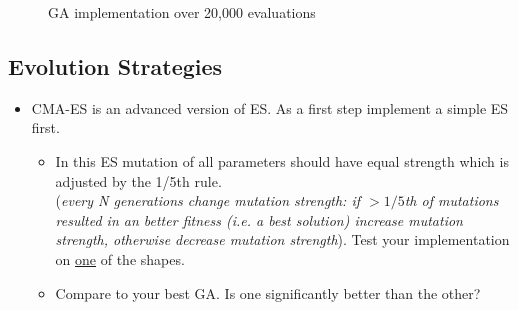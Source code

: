 \documentclass{article}
\begin{document}
\begin{itemize}
\begin{figure}[http]
\begin{subfigure}[b]{.45\linewidth}
		\end{subfigure}
		\caption{GA implementation over 20,000 evaluations}
	\end{figure}
	
\end{itemize}

\newpage
\subsection{Evolution Strategies}
\begin{itemize}
	\item CMA-ES is an advanced version of ES. As a first step implement a simple ES first. 
		\begin{itemize}
			\item In this ES mutation of all parameters should have equal strength which is adjusted by the 1/5th rule.\\(\textit{every N generations change mutation strength: if $>1/5$th of mutations resulted in an better fitness (i.e. a best solution) increase mutation strength, otherwise decrease mutation strength}). Test your implementation on \underline{one} of the shapes.
			\item Compare to your best GA. Is one significantly better than the other?
			\\\color{blue}\\
			\begin{figure}[http]
				

\end{figure}
\end{itemize}
\end{itemize}
\end{document}
